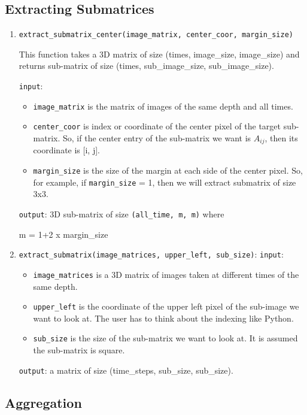 \documentclass[12pt, letterpaper]{article}
\def\code#1{\texttt{#1}}
\begin{document}
\subsection{Extracting Submatrices}

\begin{enumerate}
\item {\small {\code{extract\_submatrix\_center(image\_matrix, center\_coor, margin\_size)} }}

This function takes a 3D matrix of size {\small{(times, image\_size, image\_size)}} and returns sub-matrix of size {\small{(times, sub\_image\_size, sub\_image\_size)}}.

\code{input}:

\begin{itemize}
\item \code{image\_matrix} is the matrix of images of the same depth and all times.
\item \code{center\_coor} is index or coordinate of the center pixel of the target sub-matrix. So, if the center entry of the sub-matrix we want is $A_{ij}$, then its coordinate is [i, j].
\item \code{margin\_size} is the size of the margin at each side of the center pixel. So, for example, if \code{margin\_size} = 1, then we will extract submatrix of size 3x3.
\end{itemize}
\code{output}: 3D sub-matrix of size \code{(all\_time, m, m)} where 

m = 1+2 x margin\_size

\item \code{extract\_submatrix(image\_matrices, upper\_left, sub\_size)}:
\code{input}: 
\begin{itemize}
\item \code{image\_matrices} is a 3D matrix of images taken at different times of the same depth.
\item \code{upper\_left} is the coordinate of the upper left pixel of the sub-image  we want to look at. The user has to think about the indexing like Python.
\item \code{sub\_size} is the size of the sub-matrix we want to look at. It is assumed the sub-matrix is square.
\end{itemize}

\code{output}: a matrix of size (time\_steps, sub\_size, sub\_size).
\end{enumerate}

\subsection{Aggregation}
\end{document}
